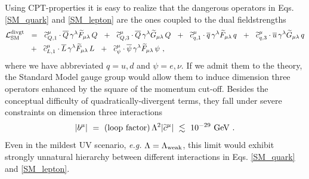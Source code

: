 \documentclass[12pt]{revtex4}
\newcommand{\wt}{\widetilde}
\newcommand{\ov}{\overline}
\begin{document}
	Using CPT-properties it is easy to realize that the dangerous operators
	in Eqs. \eqref{SM_quark} and \eqref{SM_lepton} are the ones coupled to
	the dual fieldstrengths
\begin{align}
\label{SM_divgt}
\notag
	\mathcal{L}_{\rm SM}^{\rm divgt} & ~~=~~
	\wt{c}_{Q,1}^\mu \cdot
	\ov{Q}\, \gamma^\lambda \wt{F}_{\mu\lambda}\, Q 
	~~+~~
	\wt{c}_{Q,3}^\mu \cdot
	\ov{Q}\, \gamma^\lambda \wt{G}_{\mu\lambda}\, Q 
	~~+~~
	\wt{c}_{q,1}^\mu \cdot
	\ov{q}\, \gamma^\lambda \wt{F}_{\mu\lambda}\, q
	~~+~~ 
	\wt{c}_{q,3}^\mu \cdot
	\ov{u}\, \gamma^\lambda \wt{G}_{\mu\lambda}\, q
	\\
	&
	~~+~~ 
	\wt{c}_{L,1}^\mu \cdot
	\ov{L}\, \gamma^{\lambda} \wt{F}_{\mu\lambda}\, L
	~~+~~
	\wt{c}_{\psi}^\mu \cdot
	\ov{\psi}\, \gamma^{\lambda} \wt{F}_{\mu\lambda}\, \psi
	~,
\end{align}
	where we have abbreviated $ q = u, d $ and $ \psi = e, \nu $.
	If we admit them to the theory, the Standard Model gauge group
	would allow them to induce dimension three operators enhanced by the
	square of the momentum cut-off. 
	Besides the conceptual difficulty of quadratically-divergent terms,
	they fall under severe constraints on dimension three
	interactions
\begin{equation}
\label{limit_dim3}
	| b^\mu | ~=~ ({\rm loop\ factor})\, 
		\Lambda^2 | \wt{c}^\mu |  ~\lesssim~ 10^{-29}~{\rm GeV}~.
\end{equation}
	Even in the mildest UV scenario, {\it e.g.} $ \Lambda = \Lambda_{\rm weak} $,
	this limit would exhibit strongly unnatural hierarchy between different interactions
	in Eqs. \eqref{SM_quark} and \eqref{SM_lepton}. 
	
\end{document}
